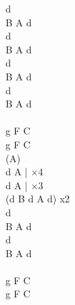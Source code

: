 \documentclass[a5paper, 10pt]{book}
\begin{document}
\begin{minipage}[t]{0.2\textwidth}
 d\\
B A d\\
 d\\
B A d\\
 d\\
B A d\\
 d\\
B A d\\
\\
g F C\\
g F C\\
(A)\\
 d A | $\times$4\\
 d A | $\times$3\\
(d B d A d) x2\\

 d\\
B A d\\
 d\\
B A d\\
 \\
g F C\\
g F C\\
\end{minipage}

\newpage
\end{document}
